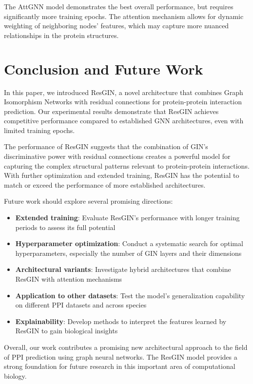 \documentclass[conference]{IEEEtran}
\begin{document}
The AttGNN model demonstrates the best overall performance, but requires significantly more training epochs. The attention mechanism allows for dynamic weighting of neighboring nodes' features, which may capture more nuanced relationships in the protein structures.

\section{Conclusion and Future Work}
In this paper, we introduced ResGIN, a novel architecture that combines Graph Isomorphism Networks with residual connections for protein-protein interaction prediction. Our experimental results demonstrate that ResGIN achieves competitive performance compared to established GNN architectures, even with limited training epochs.

The performance of ResGIN suggests that the combination of GIN's discriminative power with residual connections creates a powerful model for capturing the complex structural patterns relevant to protein-protein interactions. With further optimization and extended training, ResGIN has the potential to match or exceed the performance of more established architectures.

Future work should explore several promising directions:

\begin{itemize}
    \item \textbf{Extended training}: Evaluate ResGIN's performance with longer training periods to assess its full potential
    \item \textbf{Hyperparameter optimization}: Conduct a systematic search for optimal hyperparameters, especially the number of GIN layers and their dimensions
    \item \textbf{Architectural variants}: Investigate hybrid architectures that combine ResGIN with attention mechanisms
    \item \textbf{Application to other datasets}: Test the model's generalization capability on different PPI datasets and across species
    \item \textbf{Explainability}: Develop methods to interpret the features learned by ResGIN to gain biological insights
\end{itemize}

Overall, our work contributes a promising new architectural approach to the field of PPI prediction using graph neural networks. The ResGIN model provides a strong foundation for future research in this important area of computational biology.
\end{document}
